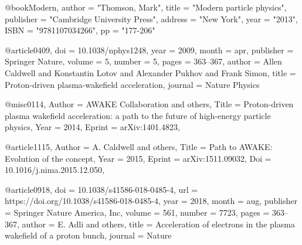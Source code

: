 
@book{Modern,
      author         = "Thomson, Mark",
      title          = "{Modern particle physics}",
      publisher      = "Cambridge University Press",
      address        = "New York",
      year           = "2013",
      ISBN           = "9781107034266",
      pp			 = "177-206"
}

@article{0409,
  doi = {10.1038/nphys1248},
  year  = {2009},
  month = {apr},
  publisher = {Springer Nature},
  volume = {5},
  number = {5},
  pages = {363--367},
  author = {Allen Caldwell and Konstantin Lotov and Alexander Pukhov and Frank Simon},
  title = {Proton-driven plasma-wakefield acceleration},
  journal = {Nature Physics}
}

@misc{0114,
Author = { AWAKE Collaboration and others},
Title = {Proton-driven plasma wakefield acceleration: a path to the future of high-energy particle physics},
Year = {2014},
Eprint = {arXiv:1401.4823},
}

@article{1115,
Author = {A. Caldwell and others},
Title = {Path to AWAKE: Evolution of the concept},
Year = {2015},
Eprint = {arXiv:1511.09032},
Doi = {10.1016/j.nima.2015.12.050},
}

@article{0918,
  doi = {10.1038/s41586-018-0485-4},
  url = {https://doi.org/10.1038/s41586-018-0485-4},
  year  = {2018},
  month = {aug},
  publisher = {Springer Nature America,  Inc},
  volume = {561},
  number = {7723},
  pages = {363--367},
  author = {E. Adli and others},
  title = {Acceleration of electrons in the plasma wakefield of a proton bunch},
  journal = {Nature}
}
